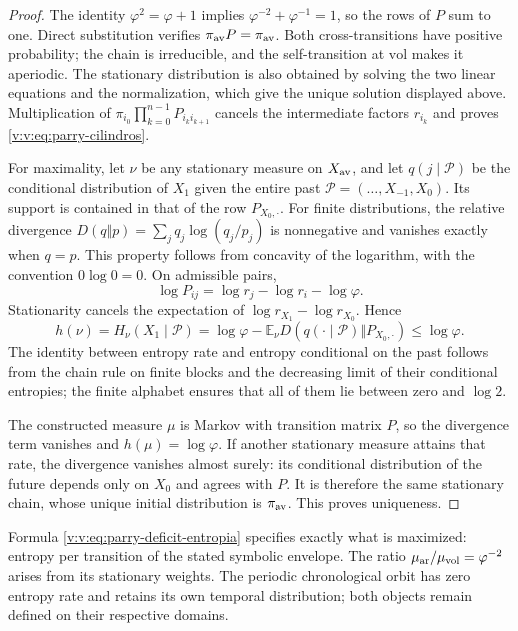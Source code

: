 \begin{proof}
The identity \(\varphi^2=\varphi+1\) implies
\(\varphi^{-2}+\varphi^{-1}=1\), so the rows of \(P\)
sum to one. Direct substitution verifies
\(\pi_{\rm av}P=\pi_{\rm av}\). Both cross-transitions
have positive probability; the chain is irreducible, and the self-transition
at \(\mathrm{vol}\) makes it aperiodic. The stationary distribution
is also obtained by solving the two linear equations and the
normalization, which give the unique solution displayed above. Multiplication of
\(\pi_{i_0}\prod_{k=0}^{n-1}P_{i_k i_{k+1}}\) cancels the intermediate
factors \(r_{i_k}\) and proves \eqref{v:v:eq:parry-cilindros}.

For maximality, let \(\nu\) be any stationary measure
on \(X_{\rm av}\), and let
\(q(j\mid\mathcal P)\) be the conditional distribution of \(X_1\)
given the entire past \(\mathcal P=(\ldots,X_{-1},X_0)\).
Its support is contained in that of the row \(P_{X_0,\cdot}\).
For finite distributions, the relative divergence
\(D(q\Vert p)=\sum_jq_j\log(q_j/p_j)\) is nonnegative and
vanishes exactly when \(q=p\). This property follows from
concavity of the logarithm, with the convention \(0\log0=0\).
On admissible pairs,
\[
 \log P_{ij}=\log r_j-\log r_i-\log\varphi.
\]
Stationarity cancels the expectation of
\(\log r_{X_1}-\log r_{X_0}\). Hence
\begin{equation}
 h(\nu)=H_\nu(X_1\mid\mathcal P)
 =\log\varphi-
 \mathbb E_\nu D\!\left(q(\cdot\mid\mathcal P)
                  \Vert P_{X_0,\cdot}\right)
 \leq\log\varphi.
 \label{v:v:eq:parry-deficit-entropia}
\end{equation}
The identity between entropy rate and entropy conditional on the past follows
from the chain rule on finite blocks and the decreasing limit
of their conditional entropies; the finite alphabet ensures
that all of them lie between zero and \(\log2\).

The constructed measure \(\mu\) is Markov with transition matrix \(P\),
so the divergence term vanishes and
\(h(\mu)=\log\varphi\). If another stationary measure attains
that rate, the divergence vanishes almost surely: its conditional
distribution of the future depends only on \(X_0\) and agrees with \(P\).
It is therefore the same stationary chain, whose unique initial
distribution is \(\pi_{\rm av}\). This proves uniqueness.
\end{proof}

Formula \eqref{v:v:eq:parry-deficit-entropia} specifies exactly what is maximized:
entropy per transition of the stated symbolic envelope. The ratio
\(\mu_{\rm ar}/\mu_{\rm vol}=\varphi^{-2}\) arises from its stationary
weights. The periodic chronological orbit has zero entropy
rate and retains its own temporal distribution; both objects remain
defined on their respective domains.

